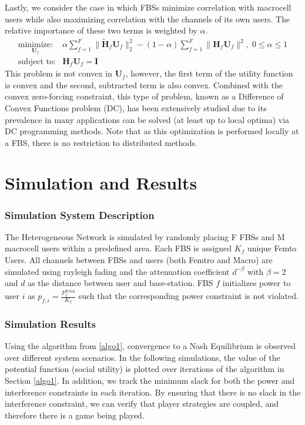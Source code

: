\documentclass[12pt,a4paper]{report}
\begin{document}
\par
Lastly, we consider the case in which FBSs minimize correlation with macrocell users while also maximizing correlation with the channels of its own users. The relative importance of these two terms is weighted by $\alpha.$
    \begin{equation}
    \begin{array}{ll}
    \underset{\mathbf{U}_{f} }{\text{minimize:}}   & \alpha\sum^F_{f=1} \|\mathbf{\tilde{H}}_{f}  \mathbf{U}_{f}\|^2_2
    -
    (1-\alpha)\sum^F_{f=1} \|\mathbf{H}_{f}  \mathbf{U}_{f}\|^2, \; 0\leq \alpha \leq 1
    \\
    \mbox{subject to:} & \mathbf{H}_{f}  \mathbf{U}_{f} = \mathbf{I}
    \end{array}
    \label{e-opt-prob}
    \end{equation}
    This problem is not convex in $\mathbf{U}_{f}$, however, the first term of the utility function is convex and the second, subtracted term is also convex. Combined with the convex zero-forcing constraint, this type of problem, known as a Difference of Convex Functions problem (DC), has been extensively studied due to its prevalence in many applications can be solved (at least up to local optima) via DC programming methods. Note that as this optimization is performed locally at a FBS, there is no restriction to distributed methods.
     


\chapter{Simulation and Results}\label{numerical}
\subsection{Simulation System Description}
The Heterogeneous Network is simulated by randomly placing F FBSs and M macrocell users within a predefined area. Each FBS is assigned $K_{f}$ unique Femto Users. All channels between FBSs and users (both Femtro and Macro) are simulated using rayleigh fading and the attenuation coefficient $d^{- \beta}$ with $\beta =2$ and $d$ as the distance between user and base-station.
FBS $f$ initializes power to user $i$ as $p_{f,i} = \frac{{P_{f}^{\text{Total}}}}{K_{f}} $ such that the corresponding power constraint is not violated. 


\subsection{Simulation Results}
Using the algorithm from \ref{algo1}, convergence to a Nash Equilibrium is observed over different system scenarios. 
In the following simulations, the value of the potential function (social utility) is plotted over iterations of the algorithm in Section \ref{algo1}. In addition, we track the minimum slack for both the power and interference constraints in each iteration. By ensuring that there is no slack in the interference constraint, we can verify that player strategies are coupled, and therefore there is a game being played. 
\end{document}
